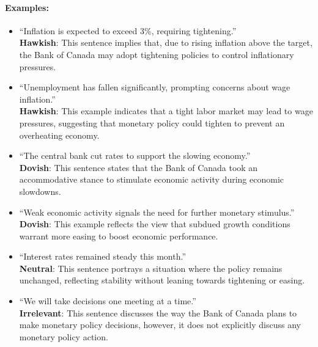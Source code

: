 \paragraph{Examples: } 
\begin{itemize} 
    \item ``Inflation is expected to exceed 3\%, requiring tightening.''\\ 
    \textbf{Hawkish}: This sentence implies that, due to rising inflation above the target, the Bank of Canada may adopt tightening policies to control inflationary pressures.
    
    \item ``Unemployment has fallen significantly, prompting concerns about wage inflation.''\\
    \textbf{Hawkish}: This example indicates that a tight labor market may lead to wage pressures, suggesting that monetary policy could tighten to prevent an overheating economy.
    
    \item ``The central bank cut rates to support the slowing economy.''\\
    \textbf{Dovish}: This sentence states that the Bank of Canada took an accommodative stance to stimulate economic activity during economic slowdowns.
    
    \item ``Weak economic activity signals the need for further monetary stimulus.''\\
    \textbf{Dovish}: This example reflects the view that subdued growth conditions warrant more easing to boost economic performance.
    
    \item ``Interest rates remained steady this month.''\\
    \textbf{Neutral}: This sentence portrays a situation where the policy remains unchanged, reflecting stability without leaning towards tightening or easing.

    \item ``We will take decisions one meeting at a time.'' \\
    \textbf{Irrelevant}: This sentence discusses the way the Bank of Canada plans to make monetary policy decisions, however, it does not explicitly discuss any monetary policy action.
\end{itemize}


\newpage


